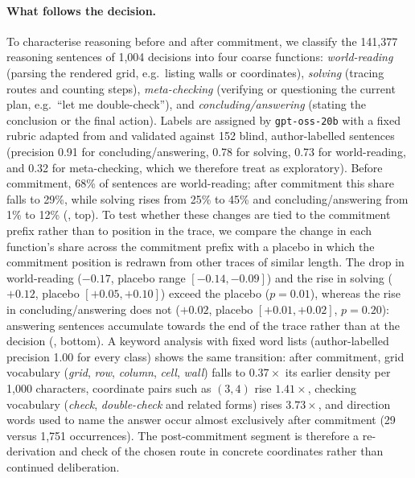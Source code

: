 \documentclass{article}
\begin{document}
\paragraph{What follows the decision.}
To characterise reasoning before and after commitment, we classify the 141,377 reasoning sentences of 1,004 decisions into four coarse functions: \emph{world-reading} (parsing the rendered grid, e.g.\ listing walls or coordinates), \emph{solving} (tracing routes and counting steps), \emph{meta-checking} (verifying or questioning the current plan, e.g.\ ``let me double-check''), and \emph{concluding/answering} (stating the conclusion or the final action).
Labels are assigned by \texttt{gpt-oss-20b} with a fixed rubric adapted from \citet{bogdan2025thought} and validated against 152 blind, author-labelled sentences (precision 0.91 for concluding/answering, 0.78 for solving, 0.73 for world-reading, and 0.32 for meta-checking, which we therefore treat as exploratory).
Before commitment, 68\% of sentences are world-reading; after commitment this share falls to 29\%, while solving rises from 25\% to 45\% and concluding/answering from 1\% to 12\% (, top).
To test whether these changes are tied to the commitment prefix rather than to position in the trace, we compare the change in each function's share across the commitment prefix with a placebo in which the commitment position is redrawn from other traces of similar length.
The drop in world-reading ($-0.17$, placebo range $[-0.14,-0.09]$) and the rise in solving ($+0.12$, placebo $[+0.05,+0.10]$) exceed the placebo ($p=0.01$), whereas the rise in concluding/answering does not ($+0.02$, placebo $[+0.01,+0.02]$, $p=0.20$): answering sentences accumulate towards the end of the trace rather than at the decision (, bottom).
A keyword analysis with fixed word lists (author-labelled precision 1.00 for every class) shows the same transition: after commitment, grid vocabulary (\emph{grid}, \emph{row}, \emph{column}, \emph{cell}, \emph{wall}) falls to $0.37\times$ its earlier density per 1,000 characters, coordinate pairs such as $(3,4)$ rise $1.41\times$, checking vocabulary (\emph{check}, \emph{double-check} and related forms) rises $3.73\times$, and direction words used to name the answer occur almost exclusively after commitment (29 versus 1,751 occurrences).
The post-commitment segment is therefore a re-derivation and check of the chosen route in concrete coordinates rather than continued deliberation.
\end{document}

